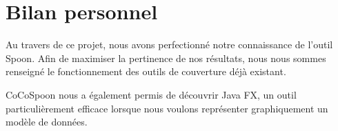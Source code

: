 \chapter*{Bilan personnel}
	\thispagestyle{personal_pov}
	
	\par Au travers de ce projet, nous avons perfectionné notre connaissance de l'outil Spoon. Afin de maximiser la pertinence de nos résultats, nous nous sommes renseigné le fonctionnement des outils de couverture déjà existant. 
	\par CoCoSpoon nous a également permis de découvrir Java FX, un outil particulièrement efficace lorsque nous voulons représenter graphiquement un modèle de données.